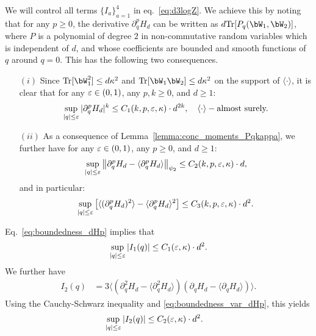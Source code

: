We will control all terms $\{I_a\}_{a=1}^4$ in eq.~\eqref{eq:d3logZ}.
We achieve this by noting that 
for any $p \geq 0$, the derivative $\partial_q^p H_d$ can be written as $d\Tr[P_q(\bW_1, \bW_2)]$, 
where $P$ is a polynomial of degree $2$ in non-commutative random variables which is independent of $d$, and whose coefficients are bounded and smooth functions of $q$ around $q = 0$.
This has the following two consequences.
\begin{itemize}
    \item[$(i)$] Since $\Tr[\bW_1^2] \leq d \kappa^2$ and $\Tr[\bW_1 \bW_2] \leq d \kappa^2$ 
    on the support of $\langle \cdot \rangle$, 
    it is clear that for any $\varepsilon \in (0,1)$, any $p, k \geq 0$, and $d \geq 1$:
    \begin{align}\label{eq:boundedness_dHp}
        \sup_{|q| \leq \varepsilon} |\partial_q^p H_d|^k \leq C_1(k, p, \varepsilon, \kappa) \cdot d^{2k},
        \hspace{10pt}
         \langle \cdot \rangle-\textrm{almost surely.}
    \end{align}
    \item[$(ii)$] 
    As a consequence of Lemma~\ref{lemma:conc_moments_Pqkappa}, we further have
    for any $\varepsilon \in (0,1)$, any $p \geq 0$, and $d \geq 1$:
    \begin{align}\label{eq:boundedness_var_dHp_psi2}
        \sup_{|q| \leq \varepsilon} \left\|\partial_q^p H_d - \langle \partial_q^p H_d \rangle\right\|_{\psi_2} \leq C_2(k, p, \varepsilon, \kappa) \cdot d,
    \end{align}
    and in particular:
    \begin{align}\label{eq:boundedness_var_dHp}
        \sup_{|q| \leq \varepsilon} \left[\langle (\partial_q^p H_d)^2 \rangle - \langle \partial_q^p H_d \rangle^2\right] \leq C_3(k, p, \varepsilon, \kappa) \cdot d^2.
    \end{align}
\end{itemize}
Eq.~\eqref{eq:boundedness_dHp} implies that 
\begin{align}\label{eq:I1_bound}
    \sup_{|q| \leq \varepsilon} |I_1(q)| \leq C_1(\varepsilon, \kappa) \cdot d^2.
\end{align}
We further have
\begin{align*}
    I_2(q) &= 
    3\langle(\partial^2_q H_d - \langle \partial^2_q H_d\rangle )(\partial_q H_d - \langle \partial_q H_d\rangle )\rangle.
\end{align*}
Using the Cauchy-Schwarz inequality and \eqref{eq:boundedness_var_dHp}, this yields
\begin{align}\label{eq:I2_bound}
    \sup_{|q| \leq \varepsilon} |I_2(q)| &\leq C_2(\varepsilon, \kappa) \cdot d^2.
\end{align}
